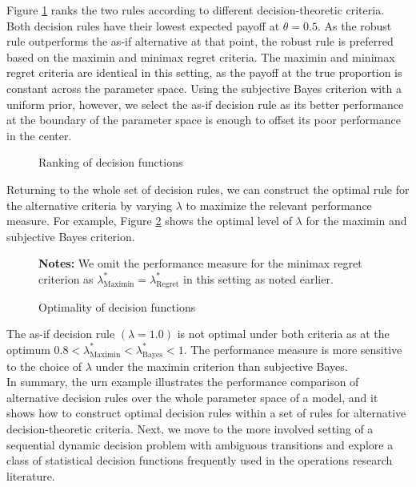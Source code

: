 Figure \ref{Ranking of decision rules} ranks the two rules according to different decision-theoretic criteria. Both decision rules have their lowest expected payoff at $\theta = 0.5$. As the robust rule outperforms the as-if alternative at that point, the robust rule is preferred based on the maximin and minimax regret criteria. The maximin and minimax regret criteria are identical in this setting, as the payoff at the true proportion is constant across the parameter space.   Using the subjective Bayes criterion with a uniform prior, however, we select the as-if decision rule as its better performance at the boundary of the parameter space is enough to offset its poor performance in the center.

\begin{figure}[h!]\centering
{}
\caption{Ranking of decision functions}\label{Ranking of decision rules}
\end{figure}\FloatBarrier

Returning to the whole set of decision rules, we can construct the optimal rule for the alternative criteria by varying $\lambda$ to maximize the relevant performance measure. For example, Figure \ref{Optimality of decision rules for urn} shows the optimal level of $\lambda$ for the maximin and subjective Bayes criterion.

\begin{figure}[h!]\centering
{}\vspace{-0.9cm}
\begin{center}
\begin{minipage}[t]{0.5\columnwidth}
\item \scriptsize{\textbf{Notes:} We omit the performance measure for the minimax regret criterion as $\lambda^*_{\text{Maximin}} = \lambda^*_{\text{Regret}}$ in this setting as noted earlier.}
\end{minipage}
\end{center}
\caption{Optimality of decision functions}\label{Optimality of decision rules for urn}
\end{figure}\FloatBarrier

The as-if decision rule $(\lambda=1.0)$ is not optimal under both criteria as at the optimum  $0.8 < \lambda^*_{\text{Maximin}} < \lambda^*_{\text{Bayes}} < 1$. The performance measure is more sensitive to the choice of $\lambda$ under the maximin criterion than subjective Bayes.\\

In summary, the urn example illustrates the performance comparison of alternative decision rules over the whole parameter space of a model, and it shows how to construct optimal decision rules within a set of rules for alternative decision-theoretic criteria. Next, we move to the more involved setting of a sequential dynamic decision problem with ambiguous transitions and explore a class of statistical decision functions frequently used in the operations research literature.
